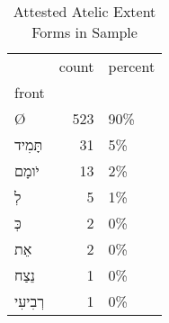 \begin{table}[htbp!]
\centering
\caption{Attested Atelic Extent Forms in Sample}
\label{table:atel_front}
\begin{tabular}{lrl}
\toprule
{} &  count & percent \\
front                 &        &         \\
\midrule
\texthebrew{Ø}        &    523 &     90\% \\
\texthebrew{תָּמִיד}  &     31 &      5\% \\
\texthebrew{יֹומָם}   &     13 &      2\% \\
\texthebrew{לְ}       &      5 &      1\% \\
\texthebrew{כְּ}      &      2 &      0\% \\
\texthebrew{אֵת}      &      2 &      0\% \\
\texthebrew{נֵצַח}    &      1 &      0\% \\
\texthebrew{רְבִיעִי} &      1 &      0\% \\
\bottomrule
\end{tabular}
\end{table}
